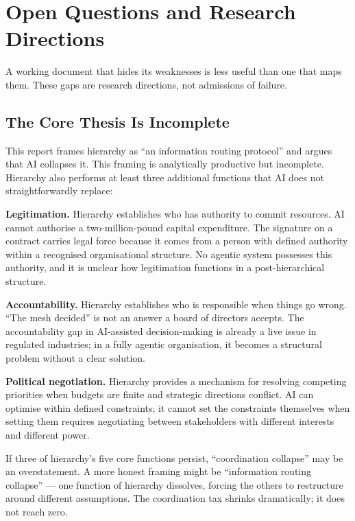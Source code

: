 \chapter{Open Questions and Research Directions}
\label{ch:open-questions}

\epigraph{A working document that hides its weaknesses is less useful than one that maps them. These gaps are research directions, not admissions of failure.}{}

\section{The Core Thesis Is Incomplete}

This report frames hierarchy as ``an information routing protocol'' and argues that AI collapses it. This framing is analytically productive but incomplete. Hierarchy also performs at least three additional functions that AI does not straightforwardly replace:

\textbf{Legitimation.} Hierarchy establishes who has authority to commit resources. AI cannot authorise a two-million-pound capital expenditure. The signature on a contract carries legal force because it comes from a person with defined authority within a recognised organisational structure. No agentic system possesses this authority, and it is unclear how legitimation functions in a post-hierarchical structure.

\textbf{Accountability.} Hierarchy establishes who is responsible when things go wrong. ``The mesh decided'' is not an answer a board of directors accepts. The accountability gap in AI-assisted decision-making is already a live issue in regulated industries; in a fully agentic organisation, it becomes a structural problem without a clear solution.

\textbf{Political negotiation.} Hierarchy provides a mechanism for resolving competing priorities when budgets are finite and strategic directions conflict. AI can optimise within defined constraints; it cannot set the constraints themselves when setting them requires negotiating between stakeholders with different interests and different power.

If three of hierarchy's five core functions persist, ``coordination collapse'' may be an overstatement. A more honest framing might be ``information routing collapse'' --- one function of hierarchy dissolves, forcing the others to restructure around different assumptions. The coordination tax shrinks dramatically; it does not reach zero.

